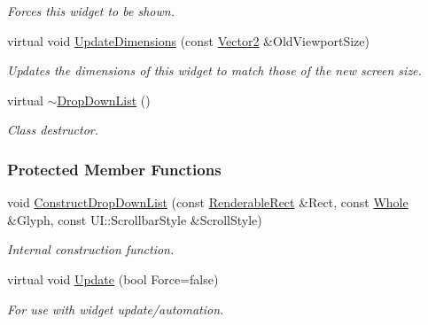 \begin{DoxyCompactItemize}
\begin{DoxyCompactList}\small\item\em Forces this widget to be shown. \item\end{DoxyCompactList}\item 
virtual void \hyperlink{classphys_1_1UI_1_1DropDownList_aa204411b17521b92acb78926d1d3f98e}{UpdateDimensions} (const \hyperlink{classphys_1_1Vector2}{Vector2} \&OldViewportSize)
\begin{DoxyCompactList}\small\item\em Updates the dimensions of this widget to match those of the new screen size. \item\end{DoxyCompactList}\item 
\hypertarget{classphys_1_1UI_1_1DropDownList_abef8eec322f0e2a6af99aac6bfc3a6eb}{
virtual \hyperlink{classphys_1_1UI_1_1DropDownList_abef8eec322f0e2a6af99aac6bfc3a6eb}{$\sim$DropDownList} ()}
\label{classphys_1_1UI_1_1DropDownList_abef8eec322f0e2a6af99aac6bfc3a6eb}

\begin{DoxyCompactList}\small\item\em Class destructor. \item\end{DoxyCompactList}\end{DoxyCompactItemize}
\subsubsection*{Protected Member Functions}
\begin{DoxyCompactItemize}
\item 
\hypertarget{classphys_1_1UI_1_1DropDownList_a2e0988db883971424579bfc4b8536065}{
void \hyperlink{classphys_1_1UI_1_1DropDownList_a2e0988db883971424579bfc4b8536065}{ConstructDropDownList} (const \hyperlink{structphys_1_1UI_1_1RenderableRect}{RenderableRect} \&Rect, const \hyperlink{namespacephys_a460f6bc24c8dd347b05e0366ae34f34a}{Whole} \&Glyph, const UI::ScrollbarStyle \&ScrollStyle)}
\label{classphys_1_1UI_1_1DropDownList_a2e0988db883971424579bfc4b8536065}

\begin{DoxyCompactList}\small\item\em Internal construction function. \item\end{DoxyCompactList}\item 
\hypertarget{classphys_1_1UI_1_1DropDownList_a1356da2f60b5ca6539f98a957b961d65}{
virtual void \hyperlink{classphys_1_1UI_1_1DropDownList_a1356da2f60b5ca6539f98a957b961d65}{Update} (bool Force=false)}
\label{classphys_1_1UI_1_1DropDownList_a1356da2f60b5ca6539f98a957b961d65}

\begin{DoxyCompactList}\small\item\em For use with widget update/automation. \item\end{DoxyCompactList}\end{DoxyCompactItemize}
